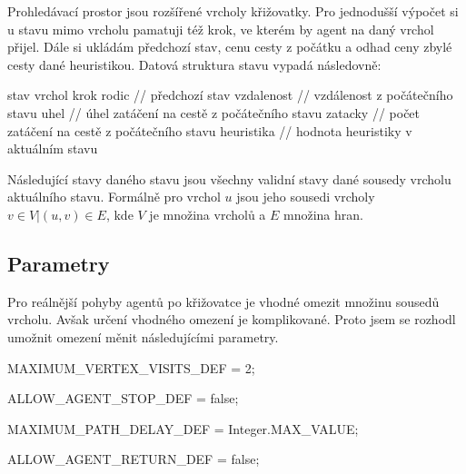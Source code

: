 Prohledávací prostor jsou rozšířené vrcholy křižovatky.
Pro jednodušší výpočet si u stavu mimo vrcholu pamatuji též krok, ve kterém by agent na daný vrchol přijel.
Dále si ukládám předchozí stav, cenu cesty z počátku a odhad ceny zbylé cesty dané heuristikou.
Datová struktura stavu vypadá následovně:
\begin{code}[frame=none]
stav {
	vrchol
	krok
	rodic       // předchozí stav
	vzdalenost  // vzdálenost z počátečního stavu
	uhel        // úhel zatáčení na cestě z počátečního stavu
	zatacky     // počet zatáčení na cestě z počátečního stavu
	heuristika  // hodnota heuristiky v aktuálním stavu
}
\end{code}

Následující stavy daného stavu jsou všechny validní stavy dané sousedy vrcholu aktuálního stavu.
Formálně pro vrchol $u$ jsou jeho sousedi vrcholy ${v \in V | (u,v)\in E}$, 
kde $V$ je množina vrcholů a $E$ množina hran.

\subsection{Parametry}\label{subsec:parametry}
Pro reálnější pohyby agentů po křižovatce je vhodné omezit množinu sousedů vrcholu.
Avšak určení vhodného omezení je komplikované.
Proto jsem se rozhodl umožnit omezení měnit následujícími parametry.

MAXIMUM_VERTEX_VISITS_DEF = 2;

ALLOW_AGENT_STOP_DEF = false;

MAXIMUM_PATH_DELAY_DEF = Integer.MAX_VALUE;

ALLOW_AGENT_RETURN_DEF = false;
